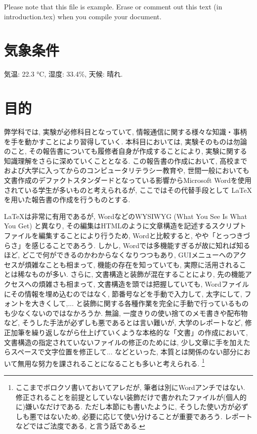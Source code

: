 Please note that this file is example.
Erase or comment out this text (in introduction.tex) when you compile your document.

\section{気象条件}
\label{sec:weather}
気温: 22.3 \si{\degreeCelsius},
湿度: 33.4\%,
天候: 晴れ.


\section{目的}
\label{sec:objective}
弊学科では, 実験が必修科目となっていて, 情報通信に関する様々な知識・事柄を手を動かすことにより習得していく.
本科目においては, 実験そのものは勿論のこと, その報告書についても履修者自身が作成することにより, 実験に関する知識理解をさらに深めていくこととなる.
この報告書の作成において, 高校までおよび大学に入ってからのコンピュータリテラシー教育や, 世間一般においても文書作成のデファクトスタンダードとなっている影響からMicrosoft Wordを使用されている学生が多いものと考えられるが,
ここではその代替手段として \LaTeX を用いた報告書の作成を行うものとする.

\LaTeX は非常に有用であるが, WordなどのWYSIWYG (What You See Is What You Get) と異なり,
その編集はHTMLのように文章構造を記述するスクリプトファイルを編集することにより行うため, Wordと比較すると, やや「とっつきづらさ」を感じることであろう.
しかし, Wordでは多機能すぎるが故に知れば知るほど, どこで何ができるのかわからなくなりつつもあり, GUIメニューへのアクセスが煩雑なことも相まって, 機能の存在を知っていても, 実際に活用されることは稀なものが多い.
さらに, 文書構造と装飾が混在することにより, 先の機能アクセスへの煩雑さも相まって, 文書構造を頭では把握していても, Wordファイルにその情報を埋め込むのではなく, 節番号などを手動で入力して, 太字にして, フォントを大きくして,... と装飾に関する各種作業を完全に手動で行っているものも少なくないのではなかろうか.
無論, 一度きりの使い捨てのメモ書きや配布物など, そうした手法が必ずしも悪であるとは言い難いが, 大学のレポートなど, 修正加筆を繰り返しながら仕上げていくような本格的な「文書」の作成において, 文書構造の指定されていないファイルの修正のためには, 少し文章に手を加えたらスペースで文字位置を修正して... などといった,
本質とは関係のない部分において無用な努力を課されることになることも多いと考えられる.
\footnote{
    ここまでボロクソ書いておいてアレだが, 筆者は別にWordアンチではない. 修正されることを前提としていない装飾だけで書かれたファイルが(個人的に)嫌いなだけである.
    ただし本節にも書いたように, そうした使い方が必ずしも悪ではないため, 必要に応じて使い分けることが重要であろう. レポートなどではご法度である, と言う話である.
}

